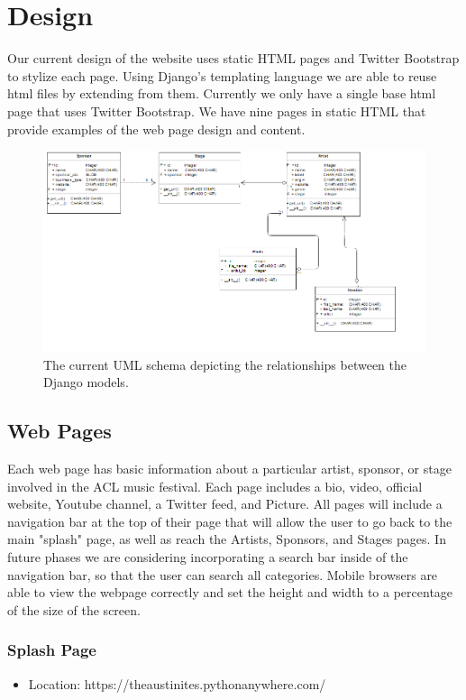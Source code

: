 \documentclass[12pt,english]{scrartcl}
\begin{document}
\section{Design}
Our current design of the website uses static HTML pages and Twitter Bootstrap to stylize each page.
Using Django's templating language we are able to reuse html files by extending from them. Currently we only have a single base html page that
uses Twitter Bootstrap. We have nine pages in static HTML that provide examples of the web page design and content.
\begin{figure}[h!]
\includegraphics[width=\textwidth]{UML}
 \caption{The current UML schema depicting the relationships between the Django models.}
\end{figure}

\subsection{Web Pages}
Each web page has basic information about a particular artist, sponsor, or stage involved in the ACL music festival.
Each page includes a bio, video, official website, Youtube channel, a Twitter feed, and Picture. All pages will include a navigation
bar at the top of their page that will allow the user to go back to the main "splash" page, as well as reach the Artists, Sponsors, and
Stages pages. In future phases we are considering incorporating a search bar inside of the navigation bar, so that the user can search
all categories. Mobile browsers are able to view the webpage correctly and set the height and width to a percentage of the size of the screen.

\subsubsection{Splash Page}
\begin{itemize}
 \item Location: https://theaustinites.pythonanywhere.com/
\end{itemize}
\end{document}
